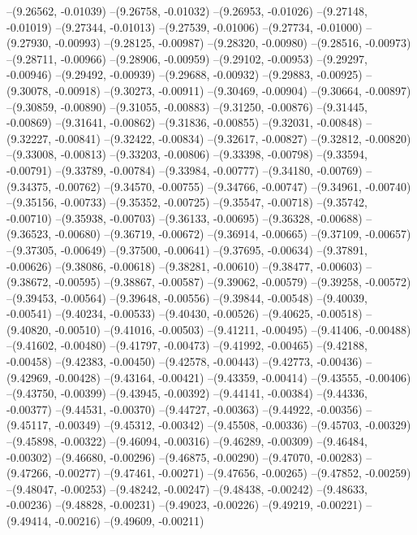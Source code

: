 --(9.26562, -0.01039)
--(9.26758, -0.01032)
--(9.26953, -0.01026)
--(9.27148, -0.01019)
--(9.27344, -0.01013)
--(9.27539, -0.01006)
--(9.27734, -0.01000)
--(9.27930, -0.00993)
--(9.28125, -0.00987)
--(9.28320, -0.00980)
--(9.28516, -0.00973)
--(9.28711, -0.00966)
--(9.28906, -0.00959)
--(9.29102, -0.00953)
--(9.29297, -0.00946)
--(9.29492, -0.00939)
--(9.29688, -0.00932)
--(9.29883, -0.00925)
--(9.30078, -0.00918)
--(9.30273, -0.00911)
--(9.30469, -0.00904)
--(9.30664, -0.00897)
--(9.30859, -0.00890)
--(9.31055, -0.00883)
--(9.31250, -0.00876)
--(9.31445, -0.00869)
--(9.31641, -0.00862)
--(9.31836, -0.00855)
--(9.32031, -0.00848)
--(9.32227, -0.00841)
--(9.32422, -0.00834)
--(9.32617, -0.00827)
--(9.32812, -0.00820)
--(9.33008, -0.00813)
--(9.33203, -0.00806)
--(9.33398, -0.00798)
--(9.33594, -0.00791)
--(9.33789, -0.00784)
--(9.33984, -0.00777)
--(9.34180, -0.00769)
--(9.34375, -0.00762)
--(9.34570, -0.00755)
--(9.34766, -0.00747)
--(9.34961, -0.00740)
--(9.35156, -0.00733)
--(9.35352, -0.00725)
--(9.35547, -0.00718)
--(9.35742, -0.00710)
--(9.35938, -0.00703)
--(9.36133, -0.00695)
--(9.36328, -0.00688)
--(9.36523, -0.00680)
--(9.36719, -0.00672)
--(9.36914, -0.00665)
--(9.37109, -0.00657)
--(9.37305, -0.00649)
--(9.37500, -0.00641)
--(9.37695, -0.00634)
--(9.37891, -0.00626)
--(9.38086, -0.00618)
--(9.38281, -0.00610)
--(9.38477, -0.00603)
--(9.38672, -0.00595)
--(9.38867, -0.00587)
--(9.39062, -0.00579)
--(9.39258, -0.00572)
--(9.39453, -0.00564)
--(9.39648, -0.00556)
--(9.39844, -0.00548)
--(9.40039, -0.00541)
--(9.40234, -0.00533)
--(9.40430, -0.00526)
--(9.40625, -0.00518)
--(9.40820, -0.00510)
--(9.41016, -0.00503)
--(9.41211, -0.00495)
--(9.41406, -0.00488)
--(9.41602, -0.00480)
--(9.41797, -0.00473)
--(9.41992, -0.00465)
--(9.42188, -0.00458)
--(9.42383, -0.00450)
--(9.42578, -0.00443)
--(9.42773, -0.00436)
--(9.42969, -0.00428)
--(9.43164, -0.00421)
--(9.43359, -0.00414)
--(9.43555, -0.00406)
--(9.43750, -0.00399)
--(9.43945, -0.00392)
--(9.44141, -0.00384)
--(9.44336, -0.00377)
--(9.44531, -0.00370)
--(9.44727, -0.00363)
--(9.44922, -0.00356)
--(9.45117, -0.00349)
--(9.45312, -0.00342)
--(9.45508, -0.00336)
--(9.45703, -0.00329)
--(9.45898, -0.00322)
--(9.46094, -0.00316)
--(9.46289, -0.00309)
--(9.46484, -0.00302)
--(9.46680, -0.00296)
--(9.46875, -0.00290)
--(9.47070, -0.00283)
--(9.47266, -0.00277)
--(9.47461, -0.00271)
--(9.47656, -0.00265)
--(9.47852, -0.00259)
--(9.48047, -0.00253)
--(9.48242, -0.00247)
--(9.48438, -0.00242)
--(9.48633, -0.00236)
--(9.48828, -0.00231)
--(9.49023, -0.00226)
--(9.49219, -0.00221)
--(9.49414, -0.00216)
--(9.49609, -0.00211)
